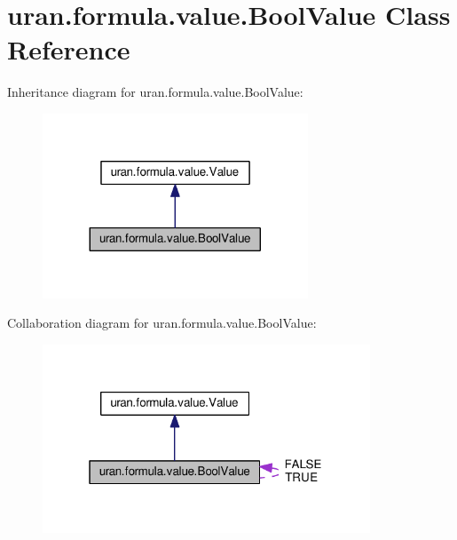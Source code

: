 \hypertarget{classuran_1_1formula_1_1value_1_1_bool_value}{}\section{uran.\+formula.\+value.\+Bool\+Value Class Reference}
\label{classuran_1_1formula_1_1value_1_1_bool_value}


Inheritance diagram for uran.\+formula.\+value.\+Bool\+Value\+:
\nopagebreak
\begin{figure}[H]
\begin{center}
\leavevmode
\includegraphics[width=224pt]{classuran_1_1formula_1_1value_1_1_bool_value__inherit__graph}
\end{center}
\end{figure}


Collaboration diagram for uran.\+formula.\+value.\+Bool\+Value\+:
\nopagebreak
\begin{figure}[H]
\begin{center}
\leavevmode
\includegraphics[width=277pt]{classuran_1_1formula_1_1value_1_1_bool_value__coll__graph}
\end{center}
\end{figure}
